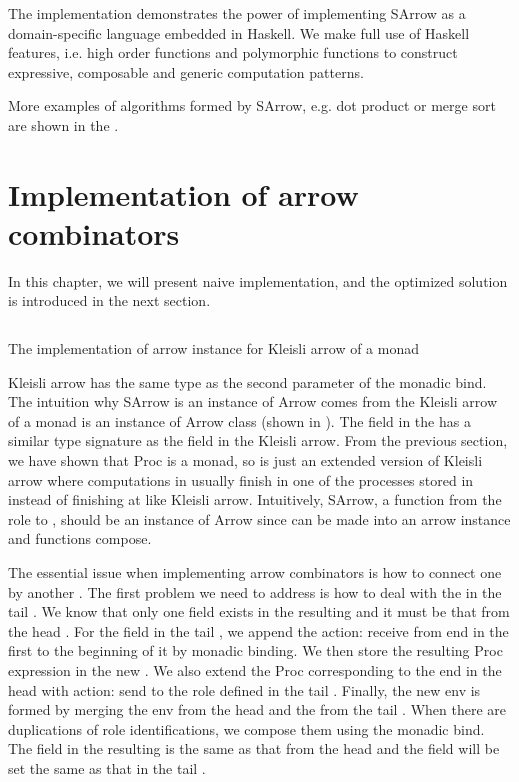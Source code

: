 The implementation demonstrates the power of implementing SArrow as a domain-specific language embedded in Haskell. We make full use of Haskell features, i.e. high order functions and polymorphic functions to construct expressive, composable and \linebreak generic computation patterns.

More examples of algorithms formed by SArrow, e.g. dot product or merge sort are shown in the .
\section{Implementation of arrow combinators} \label{SArrow:impl}
In this chapter, we will present naive implementation, and the optimized solution is introduced in the next section.

\begin{listing}[ht]
    \inputminted{Haskell}{arrow/kleisli.hs} 
    \caption{The implementation of arrow instance for Kleisli arrow of a monad}
    \label{arrow:code:kleisli}
\end{listing}

Kleisli arrow has the same type as the second parameter of the monadic bind. The intuition why SArrow is an instance of Arrow comes from the Kleisli arrow of a monad is an instance of Arrow class (shown in ). The  field in the  has a similar type signature as the  field in the Kleisli arrow. From the previous section, we have shown that Proc is a monad, so  is just an extended version of Kleisli arrow where computations in  usually finish in one of the processes stored in  instead of finishing at  like Kleisli arrow. Intuitively, SArrow, a function from the role to , should be an instance of Arrow since  can be made into an arrow instance and functions compose.

The essential issue when implementing arrow combinators is how to connect one  by another . The first problem we need to address is how to deal with the  in the tail . We know that only one  field exists in the resulting  and it must be that from the head . For the  field in the tail , we append the action: receive from end in the first  to the beginning of it by monadic binding. We then store the resulting Proc expression in the new . We also extend the Proc corresponding to the end in the head  with action: send to the  role defined in the tail . Finally, the new env is formed by merging the env from the head  and the  from the tail . When there are duplications of role identifications, we compose them using the monadic bind. The  field in the resulting  is the same as that from the head  and the  field will be set the same as that in the tail .

